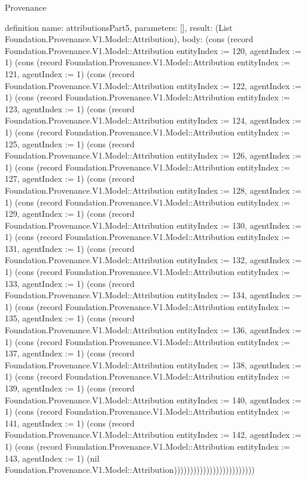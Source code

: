 \begin{lexlean}{Provenance}
\begin{semanticmodule}
definition{
  name: attributionsPart5,
  parameters: [],
  result: (List Foundation.Provenance.V1.Model::Attribution),
  body: (cons (record Foundation.Provenance.V1.Model::Attribution {entityIndex := 120, agentIndex := 1}) (cons (record Foundation.Provenance.V1.Model::Attribution {entityIndex := 121, agentIndex := 1}) (cons (record Foundation.Provenance.V1.Model::Attribution {entityIndex := 122, agentIndex := 1}) (cons (record Foundation.Provenance.V1.Model::Attribution {entityIndex := 123, agentIndex := 1}) (cons (record Foundation.Provenance.V1.Model::Attribution {entityIndex := 124, agentIndex := 1}) (cons (record Foundation.Provenance.V1.Model::Attribution {entityIndex := 125, agentIndex := 1}) (cons (record Foundation.Provenance.V1.Model::Attribution {entityIndex := 126, agentIndex := 1}) (cons (record Foundation.Provenance.V1.Model::Attribution {entityIndex := 127, agentIndex := 1}) (cons (record Foundation.Provenance.V1.Model::Attribution {entityIndex := 128, agentIndex := 1}) (cons (record Foundation.Provenance.V1.Model::Attribution {entityIndex := 129, agentIndex := 1}) (cons (record Foundation.Provenance.V1.Model::Attribution {entityIndex := 130, agentIndex := 1}) (cons (record Foundation.Provenance.V1.Model::Attribution {entityIndex := 131, agentIndex := 1}) (cons (record Foundation.Provenance.V1.Model::Attribution {entityIndex := 132, agentIndex := 1}) (cons (record Foundation.Provenance.V1.Model::Attribution {entityIndex := 133, agentIndex := 1}) (cons (record Foundation.Provenance.V1.Model::Attribution {entityIndex := 134, agentIndex := 1}) (cons (record Foundation.Provenance.V1.Model::Attribution {entityIndex := 135, agentIndex := 1}) (cons (record Foundation.Provenance.V1.Model::Attribution {entityIndex := 136, agentIndex := 1}) (cons (record Foundation.Provenance.V1.Model::Attribution {entityIndex := 137, agentIndex := 1}) (cons (record Foundation.Provenance.V1.Model::Attribution {entityIndex := 138, agentIndex := 1}) (cons (record Foundation.Provenance.V1.Model::Attribution {entityIndex := 139, agentIndex := 1}) (cons (record Foundation.Provenance.V1.Model::Attribution {entityIndex := 140, agentIndex := 1}) (cons (record Foundation.Provenance.V1.Model::Attribution {entityIndex := 141, agentIndex := 1}) (cons (record Foundation.Provenance.V1.Model::Attribution {entityIndex := 142, agentIndex := 1}) (cons (record Foundation.Provenance.V1.Model::Attribution {entityIndex := 143, agentIndex := 1}) (nil Foundation.Provenance.V1.Model::Attribution)))))))))))))))))))))))))
}


\end{semanticmodule}
\end{lexlean}
